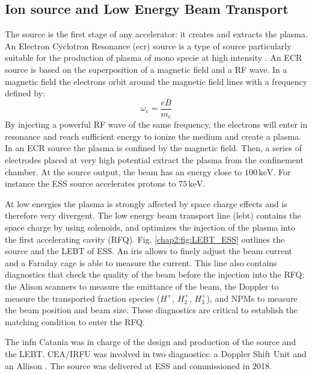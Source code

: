 \begin{refsection}
  \subsection{Ion source and Low Energy Beam Transport}
  The source is the first stage of any accelerator: it creates and extracts the plasma. An Electron Cyclotron Resonance (\acrshort{ecr}) source is a type of source particularly suitable for the production of plasma of mono specie at high intensity \cite{nicke2012}. An ECR source is based on the superposition of a magnetic field and a RF wave. In a magnetic field the electrons orbit around the magnetic field lines with a frequency defined by:
  \begin{equation}
    \omega_{e} = \frac{eB}{m_{e}}
  \end{equation}
  By injecting a powerful RF wave of the same frequency, the electrons will enter in resonance and reach sufficient energy to ionize the medium and create a plasma. In an ECR source the plasma is confined by the magnetic field. Then, a series of electrodes placed at very high potential extract the plasma from the confinement chamber. At the source output, the beam has an energy close to $100\,\mathrm{keV}$. For instance the ESS source accelerates
  protons to $75\,\mathrm{keV}$.
  

  At low energies the plasma is strongly affected by space charge effects and is therefore very divergent. The low energy beam transport line (\acrshort{lebt}) contains the space charge by using solenoids, and optimizes the injection of the plasma into the first accelerating cavity (RFQ).
  Fig. \ref{chap2:fig:LEBT_ESS} outlines the source and the LEBT of ESS. An iris allows to finely adjust the beam current and a Faraday cage is able to measure the current. This line also contains diagnostics that check the quality of the beam before the injection into the RFQ: the Alison scanners to measure the emittance of the beam, the Doppler to measure the transported fraction species ($H^{+}$, $H_{2}^{+}$, $H_{3}^{+}$), and NPMs to measure the beam position and beam size. These diagnostics are critical to establish the matching condition to enter the RFQ.

  The \acrshort{infn} Catania was in charge of the design and production of the source and the LEBT. CEA/IRFU was involved in two diagnostics: a Doppler Shift Unit \cite{Thomas:IPAC2017-MOPVA037} and an Allison \cite{Tuske:IPAC2017-MOPAB023}. The source was delivered at ESS and commissioned in 2018.


\end{refsection}
